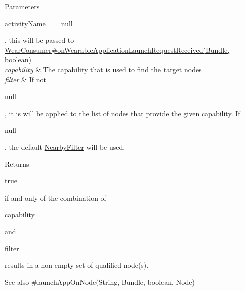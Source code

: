 \begin{DoxyParams}{Parameters}
\begin{DoxyCode}
activityName == null 
\end{DoxyCode}
 , this will be passed to \hyperlink{interfacecom_1_1google_1_1devrel_1_1wcl_1_1callbacks_1_1WearConsumer_a0facaeb65075a01fdd4c7e1049d53cf9}{Wear\+Consumer\#on\+Wearable\+Application\+Launch\+Request\+Received(\+Bundle, boolean)} \\
\hline
{\em capability} & The capability that is used to find the target nodes \\
\hline
{\em filter} & If not
\begin{DoxyCode}
null 
\end{DoxyCode}
 , it is will be applied to the list of nodes that provide the given capability. If
\begin{DoxyCode}
null 
\end{DoxyCode}
 , the default \hyperlink{}{Nearby\+Filter} will be used. \\
\hline
\end{DoxyParams}
\begin{DoxyReturn}{Returns}

\begin{DoxyCode}
\textcolor{keyword}{true} 
\end{DoxyCode}
 if and only of the combination of
\begin{DoxyCode}
capability 
\end{DoxyCode}
 and
\begin{DoxyCode}
filter 
\end{DoxyCode}
 results in a non-\/empty set of qualified node(s).
\end{DoxyReturn}
\begin{DoxySeeAlso}{See also}
\#launch\+App\+On\+Node(\+String, Bundle, boolean, Node) 
\end{DoxySeeAlso}
